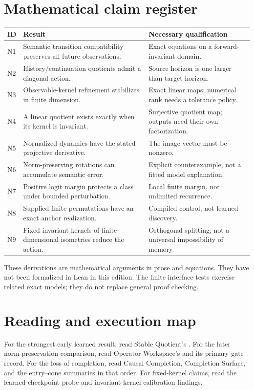 \documentclass[11pt]{article}
\begin{document}
\section{Mathematical claim register}
\begin{longtable}{P{0.12\textwidth}P{0.46\textwidth}P{0.32\textwidth}}
\toprule ID & Result & Necessary qualification\\\midrule\endhead
N1 & Semantic transition compatibility preserves all future observations. & Exact equations on a forward-invariant domain.\\
N2 & History/continuation quotients admit a diagonal action. & Source horizon is one larger than target horizon.\\
N3 & Observable-kernel refinement stabilizes in finite dimension. & Exact linear maps; numerical rank needs a tolerance policy.\\
N4 & A linear quotient exists exactly when its kernel is invariant. & Surjective quotient map; outputs need their own factorization.\\
N5 & Normalized dynamics have the stated projective derivative. & The image vector must be nonzero.\\
N6 & Norm-preserving rotations can accumulate semantic error. & Explicit counterexample, not a fitted model explanation.\\
N7 & Positive logit margin protects a class under bounded perturbation. & Local finite margin, not unlimited recurrence.\\
N8 & Supplied finite permutations have an exact anchor realization. & Compiled control, not learned discovery.\\
N9 & Fixed invariant kernels of finite-dimensional isometries reduce the action. & Orthogonal splitting; not a universal impossibility of memory.\\\bottomrule
\end{longtable}
These derivations are mathematical arguments in prose and equations. They have not been formalized in Lean in this edition. The finite interface tests exercise related exact models; they do not replace general proof checking.

\section{Reading and execution map}
For the strongest early learned result, read Stable Quotient's . For the later norm-preservation comparison, read Operator Workspace's  and its primary gate record. For the loss of completion, read Causal Completion, Completion Surface, and the entry--cone summaries in that order. For fixed-kernel claims, read the learned-checkpoint probe and invariant-kernel calibration findings.
\end{document}
